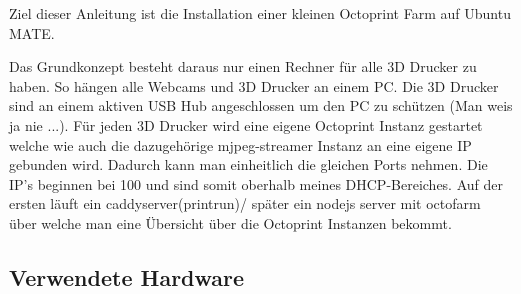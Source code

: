 
Ziel dieser Anleitung ist die Installation einer kleinen Octoprint Farm auf Ubuntu MATE.

Das Grundkonzept besteht daraus nur einen Rechner für alle 3D Drucker zu haben. So hängen alle Webcams und 3D Drucker an einem PC. Die 3D Drucker sind an einem aktiven USB Hub angeschlossen um den PC zu schützen (Man weis ja nie ...). Für jeden 3D Drucker wird eine eigene Octoprint Instanz gestartet welche wie auch die dazugehörige mjpeg-streamer Instanz an eine eigene IP gebunden wird. Dadurch kann man einheitlich die gleichen Ports nehmen. Die IP's beginnen bei 100 und sind somit oberhalb meines DHCP-Bereiches. Auf der ersten läuft ein caddyserver(printrun)/ später ein nodejs server mit octofarm über welche man eine Übersicht über die Octoprint Instanzen bekommt.


\newcommand{\hwspace}{
  -0,25cm
}
\subsection{Verwendete Hardware}

